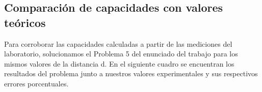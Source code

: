 \documentclass{article}
\begin{document}

    
\subsection{Comparación de capacidades con valores teóricos}
Para corroborar las capacidades calculadas a partir de las mediciones del laboratorio, solucionamos el Problema 5 del 
enunciado del trabajo para los mismos valores de la distancia d. En el siguiente cuadro se encuentran los resultados del 
problema junto a nuestros valores experimentales y sus respectivos errores porcentuales.
\end{document}
